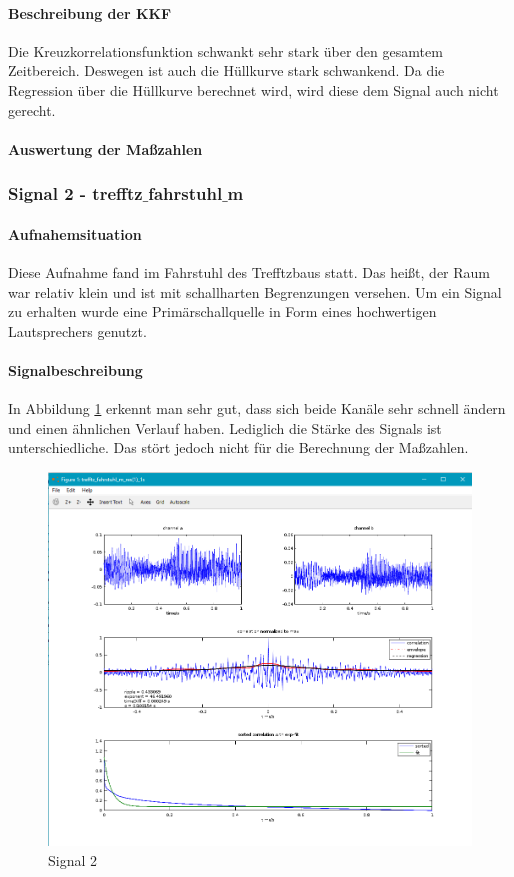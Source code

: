 \paragraph{Beschreibung der KKF} Die Kreuzkorrelationsfunktion schwankt sehr stark über den gesamtem Zeitbereich. Deswegen ist auch die Hüllkurve stark schwankend. Da die Regression über die Hüllkurve berechnet wird, wird diese dem Signal auch nicht gerecht.
\paragraph{Auswertung der Maßzahlen}

\subsubsection{Signal 2 - trefftz$\_$fahrstuhl$\_$m}
\paragraph{Aufnahemsituation} Diese Aufnahme fand im Fahrstuhl des Trefftzbaus statt. Das heißt, der Raum war relativ klein und ist mit schallharten Begrenzungen versehen. Um ein Signal zu erhalten wurde eine Primärschallquelle in Form eines hochwertigen Lautsprechers genutzt.
\paragraph{Signalbeschreibung}
In Abbildung \ref{figure3}  erkennt man sehr gut, dass sich beide Kanäle sehr schnell ändern und einen ähnlichen Verlauf haben. Lediglich die Stärke des Signals ist unterschiedliche. Das stört jedoch nicht für die Berechnung der Maßzahlen. 
\begin{figure}[ht!]
\centering
\includegraphics[scale=0.64]{img/trefftz_fahrstuhl_m}
\caption{Signal 2}
\label{figure3}
\end{figure}
